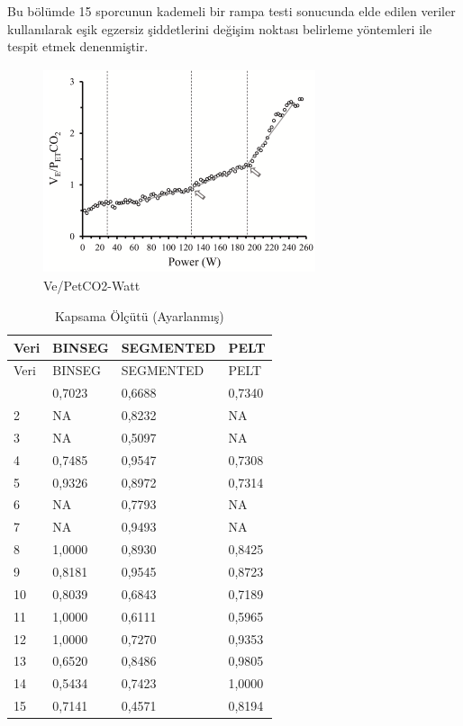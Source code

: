 \documentclass[12pt,twoside]{deuthesis}
\begin{document}
Bu bölümde 15 sporcunun kademeli bir rampa testi sonucunda elde edilen veriler kullanılarak eşik egzersiz şiddetlerini değişim noktası belirleme yöntemleri ile tespit etmek denenmiştir.

\begin{figure}
\includegraphics[width=302px,height=228px]{figure/vepetco2} \caption{Ve/PetCO2-Watt}\label{fig:unnamed-chunk-7}
\end{figure}

\begin{longtable}[]{@{}llll@{}}
\caption{\label{tab:nvar6} Kapsama Ölçütü (Ayarlanmış)}\tabularnewline
\toprule\noalign{}
Veri & BINSEG & SEGMENTED & PELT \\
\midrule\noalign{}
\endfirsthead
\toprule\noalign{}
Veri & BINSEG & SEGMENTED & PELT \\
\midrule\noalign{}
\endhead
\bottomrule\noalign{}
\endlastfoot
1 & 0,7023 & 0,6688 & 0,7340 \\
2 & NA & 0,8232 & NA \\
3 & NA & 0,5097 & NA \\
4 & 0,7485 & 0,9547 & 0,7308 \\
5 & 0,9326 & 0,8972 & 0,7314 \\
6 & NA & 0,7793 & NA \\
7 & NA & 0,9493 & NA \\
8 & 1,0000 & 0,8930 & 0,8425 \\
9 & 0,8181 & 0,9545 & 0,8723 \\
10 & 0,8039 & 0,6843 & 0,7189 \\
11 & 1,0000 & 0,6111 & 0,5965 \\
12 & 1,0000 & 0,7270 & 0,9353 \\
13 & 0,6520 & 0,8486 & 0,9805 \\
14 & 0,5434 & 0,7423 & 1,0000 \\
15 & 0,7141 & 0,4571 & 0,8194 \\
\end{longtable}
\end{document}
